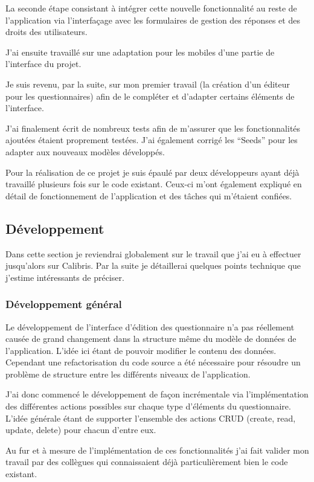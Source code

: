 \documentclass[12pt,a4paper]{book}
\begin{document}
La seconde étape consistant à intégrer cette nouvelle fonctionnalité au reste de l'application via l'interfaçage avec les formulaires de gestion des réponses et des droits des utilisateurs.

J'ai ensuite travaillé sur une adaptation pour les mobiles d'une partie de l'interface du projet.

Je suis revenu, par la suite, sur mon premier travail (la création d'un éditeur pour les questionnaires) afin de le compléter et d'adapter certains éléments de l'interface.

J'ai finalement écrit de nombreux tests afin de m'assurer que les fonctionnalités ajoutées étaient proprement testées. J'ai également corrigé les ``Seeds'' pour les adapter aux nouveaux modèles développés.

Pour la réalisation de ce projet je suis épaulé par deux développeurs ayant déjà travaillé plusieurs fois sur le code existant. Ceux-ci m'ont également expliqué en détail de fonctionnement de l'application et des tâches qui m'étaient confiées.

\subsection{Développement}

Dans cette section je reviendrai globalement sur le travail que j'ai eu à effectuer jusqu'alors sur Calibris. Par la suite je détaillerai quelques points technique que j'estime intéressants de préciser.

\subsubsection{Développement général}

Le développement de l'interface d'édition des questionnaire n'a pas réellement causée de grand changement dans la structure même du modèle de données de l'application. L'idée ici étant de pouvoir modifier le contenu des données. Cependant une refactorisation du code source a été nécessaire pour résoudre un problème de structure entre les différents niveaux de l'application.

J'ai donc commencé le développement de façon incrémentale via l'implémentation des différentes actions possibles sur chaque type d'éléments du questionnaire. L'idée générale étant de supporter l'ensemble des actions CRUD (create, read, update, delete) pour chacun d'entre eux.

Au fur et à mesure de l'implémentation de ces fonctionnalités j'ai fait valider mon travail par des collègues qui connaissaient déjà particulièrement bien le code existant.
\end{document}
